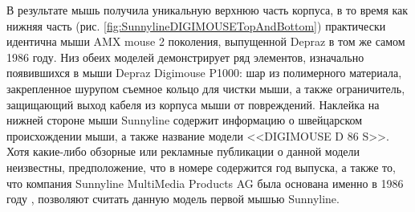 \documentclass[11pt, a4paper]{article}
\begin{document}
В результате мышь получила уникальную верхнюю часть корпуса, в то время как нижняя часть (рис. \ref{fig:SunnylineDIGIMOUSETopAndBottom}) практически идентична мыши AMX mouse 2 поколения, выпущенной Depraz в том же самом 1986 году.
Низ обеих моделей демонстрирует ряд элементов, изначально появившихся в мыши Depraz Digimouse P1000: шар из полимерного материала, закрепленное шурупом съемное кольцо для чистки мыши, а также ограничитель, защищающий выход кабеля из корпуса мыши от повреждений. Наклейка на нижней стороне мыши Sunnyline содержит информацию о швейцарском происхождении мыши, а также название модели <<DIGIMOUSE D 86 S>>. Хотя какие-либо обзорные или рекламные публикации о данной модели неизвестны, предположение, что в номере содержится год выпуска, а также то, что компания Sunnyline MultiMedia Products AG была основана именно в 1986 году \cite{Sunnyline}, позволяют считать данную модель первой мышью Sunnyline.
\end{document}
